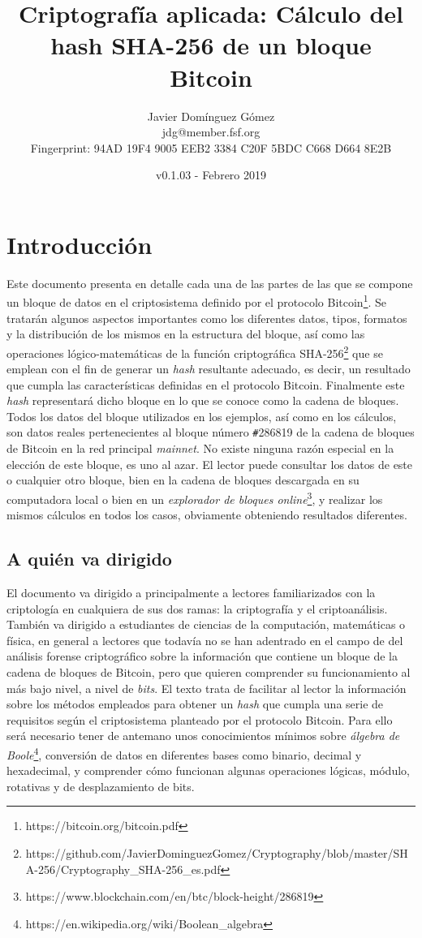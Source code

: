 \documentclass{article}
\title{\textbf{Criptografía aplicada: Cálculo del hash SHA-256 de un bloque Bitcoin}}
\author{Javier Domínguez Gómez \\
\small{jdg@member.fsf.org} \\
\small{Fingerprint: 94AD 19F4 9005 EEB2 3384 C20F 5BDC C668 D664 8E2B}}
\date{v0.1.03 - Febrero 2019}
\begin{document}
\maketitle

\tableofcontents{}

\section{Introducción}
    Este documento presenta en detalle cada una de las partes de las que se compone un bloque de datos en el criptosistema definido por el protocolo Bitcoin\footnote{https://bitcoin.org/bitcoin.pdf}. Se tratarán algunos aspectos importantes como los diferentes datos, tipos, formatos y la distribución de los mismos en la estructura del bloque, así como las operaciones lógico-matemáticas de la función criptográfica SHA-256\footnote{https://github.com/JavierDominguezGomez/Cryptography/blob/master/SHA-256/Cryptography\_SHA-256\_es.pdf} que se emplean con el fin de generar un \textit{hash} resultante adecuado, es decir, un resultado que cumpla las características definidas en el protocolo Bitcoin. Finalmente este \textit{hash} representará dicho bloque en lo que se conoce como la cadena de bloques. Todos los datos del bloque utilizados en los ejemplos, así como en los cálculos, son datos reales pertenecientes al bloque número \texttt{\#}286819 de la cadena de bloques de Bitcoin en la red principal \textit{mainnet}. No existe ninguna razón especial en la elección de este bloque, es uno al azar. El lector puede consultar los datos de este o cualquier otro bloque, bien en la cadena de bloques descargada en su computadora local o bien en un \textit{explorador de bloques online}\footnote{https://www.blockchain.com/en/btc/block-height/286819}, y realizar los mismos cálculos en todos los casos, obviamente obteniendo resultados diferentes.
    
    \subsection{A quién va dirigido}
    El documento va dirigido a principalmente a lectores familiarizados con la criptología en cualquiera de sus dos ramas: la criptografía y el criptoanálisis. También va dirigido a estudiantes de ciencias de la computación, matemáticas o física, en general a lectores que todavía no se han adentrado en el campo de del análisis forense criptográfico sobre la información que contiene un bloque de la cadena de bloques de Bitcoin, pero que quieren comprender su funcionamiento al más bajo nivel, a nivel de \textit{bits}. El texto trata de facilitar al lector la información sobre los métodos empleados para obtener un \textit{hash} que cumpla una serie de requisitos según el criptosistema planteado por el protocolo Bitcoin. Para ello será necesario tener de antemano unos conocimientos mínimos sobre \textit{álgebra de Boole}\footnote{https://en.wikipedia.org/wiki/Boolean\_algebra}, conversión de datos en diferentes bases como binario, decimal y hexadecimal, y comprender cómo funcionan algunas operaciones lógicas, módulo, rotativas y de desplazamiento de bits.
\end{document}
